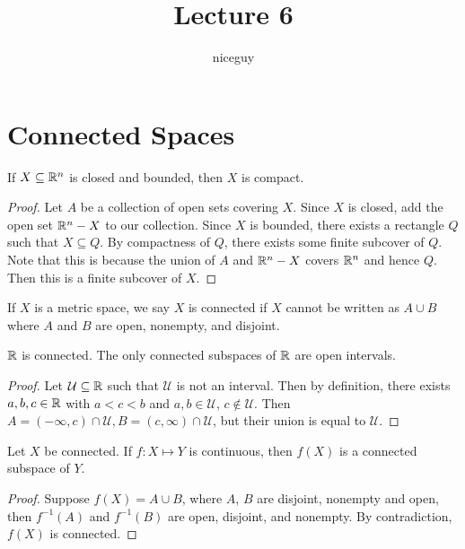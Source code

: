 \documentclass[12pt]{article}
\title{Lecture 6}
\author{niceguy}
\begin{document}
\maketitle

\section{Connected Spaces}

\begin{thm}
    If $X \subseteq \mathbb{R}^n$ is closed and bounded, then $X$ is compact.
\end{thm}

\begin{proof}
    Let $A$ be a collection of open sets covering $X$. Since $X$ is closed, add the open set $\mathbb{R}^n-X$ to our collection. Since $X$ is bounded, there exists a rectangle $Q$ such that $X \subseteq Q$. By compactness of $Q$, there exists some finite subcover of $Q$. Note that this is because the union of $A$ and $\mathbb{R}^n-X$ covers $\mathbb{R}^n$ and hence $Q$. Then this is a finite subcover of $X$.
\end{proof}

\begin{defn}
    If $X$ is a metric space, we say $X$ is connected if $X$ cannot be written as $A\cup B$ where $A$ and $B$ are open, nonempty, and disjoint.
\end{defn}

\begin{rem}
    $\mathbb{R}$ is connected. The only connected subspaces of $\mathbb{R}$ are open intervals.
\end{rem}

\begin{proof}
    Let $\mathcal U \subseteq \mathbb{R}$ such that $\mathcal U$ is not an interval. Then by definition, there exists $a,b,c\in\mathbb{R}$ with $a<c<b$ and $a,b\in\mathcal U$, $c \notin \mathcal U$. Then $A = (-\infty,c)\cap \mathcal U, B = (c,\infty)\cap \mathcal U$, but their union is equal to $\mathcal U$. 
\end{proof}

\begin{thm}
    Let $X$ be connected. If $f:X\mapsto Y$ is continuous, then $f(X)$ is a connected subspace of $Y$.
\end{thm}

\begin{proof}
    Suppose $f(X) = A\cup B$, where $A$, $B$ are disjoint, nonempty and open, then $f^{-1}(A)$ and $f^{-1}(B)$ are open, disjoint, and nonempty. By contradiction, $f(X)$ is connected.
\end{proof}
\end{document}
